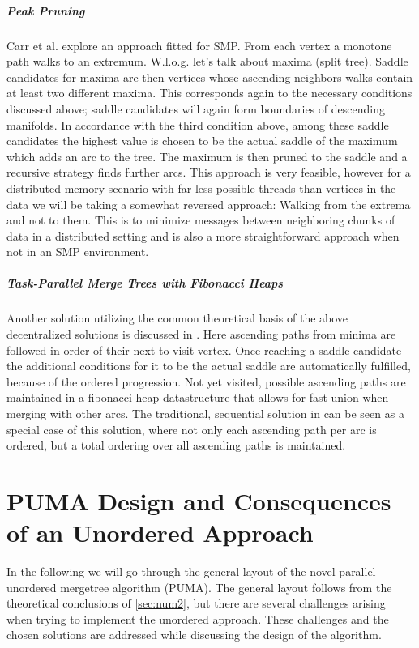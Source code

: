 \documentclass[%
	paper=A4,					%
	twoside=true,				%
	openright,					%
	parskip=full,				%
	chapterprefix=true,			%
	11pt,						%
	headings=normal,			%
	bibliography=totoc,			%
	listof=totoc,				%
	titlepage=on,				%
	captions=tableabove,		%
	draft=false,				%
]{scrreprt}%
\begin{document}
\paragraph{Peak Pruning}
Carr et al. \cite{Carr} explore an approach fitted for SMP. From each vertex a monotone path walks to an extremum. W.l.o.g. let's talk about maxima (split tree). Saddle candidates for maxima are then vertices whose ascending neighbors walks contain at least two different maxima. This corresponds again to the necessary conditions discussed above; saddle candidates will again form boundaries of descending manifolds. In accordance with the third condition above, among these saddle candidates the highest value is chosen to be the actual saddle of the maximum which adds an arc to the tree. The maximum is then pruned to the saddle and a recursive strategy finds further arcs. This approach is very feasible, however for a distributed memory scenario with far less possible threads than vertices in the data we will be taking a somewhat reversed approach: Walking from the extrema and not to them. This is to minimize messages between neighboring chunks of data in a distributed setting and is also a more straightforward approach when not in an SMP environment. 

\paragraph{Task-Parallel Merge Trees with Fibonacci Heaps}
Another solution utilizing the common theoretical basis of the above decentralized solutions is discussed in \cite{FTM}. Here ascending paths from minima are followed in order of their next to visit vertex. Once reaching a saddle candidate the additional conditions for it to be the actual saddle are automatically fulfilled, because of the ordered progression. Not yet visited, possible ascending paths are maintained in a fibonacci heap datastructure that allows for fast union when merging with other arcs. The traditional, sequential solution in \cite{orig} can be seen as a special case of this solution, where not only each ascending path per arc is ordered, but a total ordering over all ascending paths is maintained.

\chapter{PUMA Design and Consequences of an Unordered Approach}
In the following we will go through the general layout of the novel parallel unordered mergetree algorithm (PUMA). The general layout follows from the theoretical conclusions of \ref{sec:num2}, but there are several challenges arising when trying to implement the unordered approach. These challenges and the chosen solutions are addressed while discussing the design of the algorithm.
\end{document}
